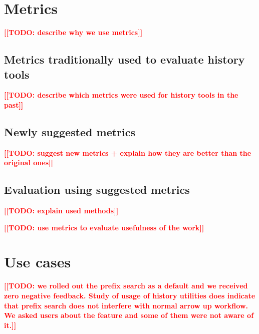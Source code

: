 \documentclass[thesis=M,english]{FITthesis}[2012/10/20]
\newcommand{\todotext}[1]{\textcolor{red}{\textbf{[[#1]]}}}
\begin{document}
\section{Metrics}

\todotext{TODO: describe why we use metrics}

\subsection{Metrics traditionally used to evaluate history tools}

\todotext{TODO: describe which metrics were used for history tools in the past}

\subsection{Newly suggested metrics}

\todotext{TODO: suggest new metrics + explain how they are better than the original ones}

\subsection{Evaluation using suggested metrics}

\todotext{TODO: explain used methods}

\todotext{TODO: use metrics to evaluate usefulness of the work}


\section{Use cases}

\todotext{TODO: we rolled out the prefix search as a default and we received zero negative feedback. Study of usage of history utilities does indicate that prefix search does not interfere with normal arrow up workflow. We asked users about the feature and some of them were not aware of it.}
\end{document}
